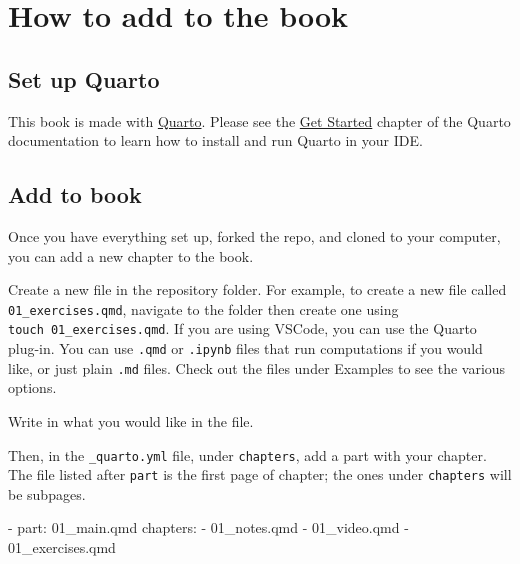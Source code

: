 \documentclass[
  letterpaper,
  DIV=11,
  numbers=noendperiod]{scrreprt}
\newenvironment{Shaded}{\begin{snugshade}}{\end{snugshade}}
\newcommand{\AttributeTok}[1]{\textcolor[rgb]{0.40,0.46,0.14}{#1}}
\newcommand{\FunctionTok}[1]{\textcolor[rgb]{0.28,0.35,0.67}{#1}}
\newcommand{\KeywordTok}[1]{\textcolor[rgb]{0.00,0.46,0.62}{#1}}
\begin{document}
\appendix
{}

\hypertarget{how-to-add-to-the-book}{%
\chapter*{How to add to the book}\label{how-to-add-to-the-book}}

\hypertarget{set-up-quarto}{%
\section*{Set up Quarto}\label{set-up-quarto}}

This book is made with \href{https://quarto.org/}{Quarto}. Please see
the \href{https://quarto.org/docs/get-started/}{Get Started} chapter of
the Quarto documentation to learn how to install and run Quarto in your
IDE.

\hypertarget{add-to-book}{%
\section*{Add to book}\label{add-to-book}}

Once you have everything set up, forked the repo, and cloned to your
computer, you can add a new chapter to the book.

Create a new file in the repository folder. For example, to create a new
file called \texttt{01\_exercises.qmd}, navigate to the folder then
create one using \texttt{touch\ 01\_exercises.qmd}. If you are using
VSCode, you can use the Quarto plug-in. You can use \texttt{.qmd} or
\texttt{.ipynb} files that run computations if you would like, or just
plain \texttt{.md} files. Check out the files under Examples to see the
various options.

Write in what you would like in the file.

Then, in the \texttt{\_quarto.yml} file, under \texttt{chapters}, add a
part with your chapter. The file listed after \texttt{part} is the first
page of chapter; the ones under \texttt{chapters} will be subpages.

\begin{Shaded}
\begin{Highlighting}[]
\AttributeTok{  }\KeywordTok{{-}}\AttributeTok{ }\FunctionTok{part}\KeywordTok{:}\AttributeTok{ 01\_main.qmd}
\AttributeTok{      }\FunctionTok{chapters}\KeywordTok{:}\AttributeTok{ }
\AttributeTok{      }\KeywordTok{{-}}\AttributeTok{ 01\_notes.qmd}
\AttributeTok{      }\KeywordTok{{-}}\AttributeTok{ 01\_video.qmd}
\AttributeTok{      }\KeywordTok{{-}}\AttributeTok{ 01\_exercises.qmd}
\end{Highlighting}
\end{Shaded}
\end{document}
